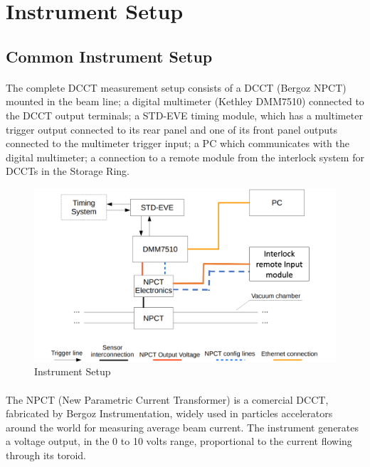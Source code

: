 \documentclass[openany]{article}
\begin{document}
\section{Instrument Setup}
\subsection{Common Instrument Setup}

	\paragraph{} The complete DCCT measurement setup consists of a DCCT (Bergoz NPCT) mounted in the beam line; a digital multimeter (Kethley DMM7510) connected to the DCCT output terminals; a STD-EVE timing module, which has a multimeter trigger output connected to its rear panel and one of its front panel outputs connected to the multimeter trigger input; a PC which communicates with the digital multimeter; a connection to a remote module from the interlock system for DCCTs in the Storage Ring.

	\begin{figure}[!h]
		\caption{Instrument Setup}
		\label{fig:dcct-setup}
		\centering
		\includegraphics[width=1.0\textwidth]{dcct_interlock_14c4}
	\end{figure}
\FloatBarrier

	\paragraph{} The NPCT (New Parametric Current Transformer) is a comercial DCCT, fabricated by Bergoz Instrumentation, widely used in particles accelerators around the world for measuring average beam current. The instrument generates a voltage output, in the 0 to 10 volts range, proportional to the current flowing through its toroid.
\end{document}
